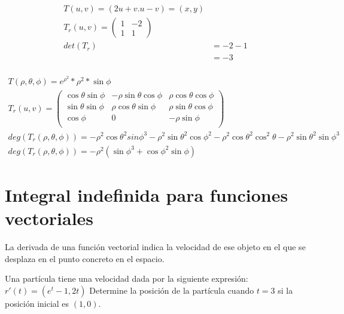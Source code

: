 \documentclass{article}
\begin{document}
\begin{align}
	T(u, v) = (2u+v. u-v)  =  (x, y)        \\
	T_r(u, v) = \left( \begin{matrix}
		                   1 & -2 \\
		                   1 & 1
	                   \end{matrix} \right) \\
	det(T_r) & = -2 -1                      \\
	         & = -3                         \\
\end{align}

\begin{align}
	T(\rho, \theta, \phi) = e^{\rho^2} * \rho^2 * \sin{\phi}                                                                                                                   \\
	T_r(u, v) = \left( \begin{matrix}
			                   \cos\theta{}\sin{\phi} & -\rho\sin{ \theta}\cos{\phi} & \rho\cos{\theta}\cos{\phi} \\
			                   \sin{\theta}\sin{\phi} & \rho\cos{\theta}\sin{\phi}   & \rho\sin{\theta}\cos{\phi} \\
			                   \cos{\phi}             & 0                            & -\rho\sin{\phi}            \\
		                   \end{matrix} \right)                                                                      \\
	deg(T_r(\rho, \theta, \phi)) = -\rho^2\cos{\theta}^2sin{\phi}^3 - \rho^2\sin{\theta}^2\cos{\phi}^2 - \rho^2\cos{\theta}^2\cos^2{\theta} - \rho^2\sin{\theta}^2\sin{\phi}^3 \\
	deg(T_r(\rho, \theta, \phi)) = -\rho^2(\sin{\phi}^3+\cos{\phi}^2\sin{\phi})
\end{align}

\section*{Integral indefinida para funciones vectoriales}

La derivada de una función vectorial indica la velocidad de ese objeto en el que
se desplaza en el punto concreto en el espacio.

Una partícula tiene una velocidad dada por la siguiente expresión:
$ r'(t) = (e^t-1, 2t) $ Determine la posición de la partícula cuando $ t = 3 $
si la posición inicial es $ (1, 0) $.
\end{document}
